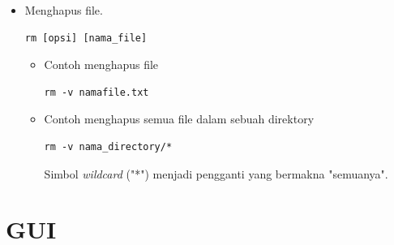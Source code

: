 \documentclass[12pt,]{article}
\begin{document}
\begin{itemize}
		\item Menghapus file.
		\begin{verbatim}
rm [opsi] [nama_file]
		\end{verbatim}
		\begin{itemize}
			\item Contoh menghapus file
			\begin{verbatim}
rm -v namafile.txt
			\end{verbatim}

			\item Contoh menghapus semua file dalam sebuah direktory
			\begin{verbatim}
rm -v nama_directory/*
			\end{verbatim}
			Simbol \textit{wildcard} ("*") menjadi pengganti yang bermakna "semuanya".
		\end{itemize}
	\end{itemize}

	\newpage
	\section{GUI}
\end{document}
